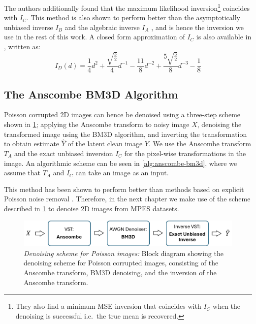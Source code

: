 The authors additionally found that the maximum likelihood inversion\footnote{They also find a minimum \gls{MSE} inversion that coincides with $I_C$ when the denoising is successful i.e.\ the true mean is recovered.} coincides with $I_C$. This method is also shown to perform better than the asymptotically unbiased inverse $I_B$ and the algebraic inverse $I_A$ \cite{makitaloOptimalInversionAnscombe2011}, and is hence the inversion we use in the rest of this work.
A closed form approximation of $I_C$ is also available in \cite{makitaloClosedFormApproximationExact2011}, written as:
\begin{equation}
    I_D(d) = \frac{1}{4} d^2 + \frac{\sqrt{\frac{3}{2}}}{4} d^{-1} - \frac{11}{8} d^{-2} + \frac{5 \sqrt{\frac{3}{2}}}{8} d^{-3} - \frac{1}{8}
\end{equation}

\subsection{The Anscombe BM3D Algorithm}
Poisson corrupted 2D images can hence be denoised using a three-step scheme shown in \cref{fig:anscombe-bm3d}; applying the Anscombe transform to noisy image $X$, denoising the transformed image using the \gls{BM3D} algorithm, and inverting the transformation to obtain estimate $\hat{Y}$ of the latent clean image $Y$. We use the Anscombe transform $T_A$ and the exact unbiased inversion $I_C$ for the pixel-wise transformations in the image. An algorithmic scheme can be seen in \cref{alg:anscombe-bm3d}, where we assume that $T_A$ and $I_C$ can take an image as an input.

This method has been shown to perform better than methods based on explicit Poisson noise removal \cite{makitaloOptimalInversionAnscombe2011}. Therefore, in the next chapter we make use of the scheme described in \cref{fig:anscombe-bm3d} to denoise 2D images from \gls{MPES} datasets.

\begin{figure} 
    \centering
    \includegraphics[width=1\linewidth]{images/bm3d_anscombe_scheme.pdf}
    \caption{\textit{Denoising scheme for Poisson images:} Block diagram showing the denoising scheme for Poisson corrupted images, consisting of the Anscombe transform, BM3D denoising, and the inversion of the Anscombe transform.}
    \label{fig:anscombe-bm3d}
\end{figure}

